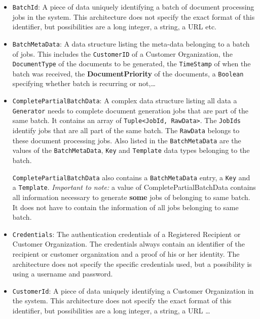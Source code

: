 \documentclass[a4paper,10pt]{article}
\begin{document}
\begin{itemize}
	\item \texttt{BatchId}: A piece of data uniquely identifying a batch of document processing jobs in the system. This architecture does not specify the exact format of this identifier, but possibilities are a long integer, a string, a URL etc.
	
	\item \texttt{BatchMetaData}: A data structure listing the meta-data belonging to a batch of jobs. This includes the \texttt{CustomerID} of a Customer Organization, the \texttt{DocumentType} of the documents to be generated, the \texttt{TimeStamp} of when the batch was received, the \textbf{DocumentPriority} of the documents, a \texttt{Boolean} specifying whether batch is recurring or not,\dots
	

	\item \texttt{CompletePartialBatchData}: A complex data structure listing all data a \texttt{Generator} needs to complete document generation jobs that are part of the same batch. It contains an array of \texttt{Tuple<JobId, RawData>}. The \texttt{JobIds} identify jobs that are all part of the same batch. The \texttt{RawData} belongs to these document processing jobs. Also listed in the \texttt{BatchMetaData} are the values of the \texttt{BatchMetaData}, \texttt{Key} and \texttt{Template} data types belonging to the batch.	
	
	 \texttt{CompletePartialBatchData} also contains a \texttt{BatchMetaData} entry, a \texttt{Key} and a \texttt{Template}. \emph{Important to note:} a value of CompletePartialBatchData contains all information necessary to generate \textbf{some} jobs of belonging to same batch. It does not have to contain the information of all jobs belonging to same batch.

	\item \texttt{Credentials}: The authentication credentials of a Registered Recipient or Customer Organization. The credentials always contain an identifier of the recipient or customer organization and a proof of his or her identity. The architecture does not specify the specific credentials used, but a possibility is using a username and password.
	 
	\item \texttt{CustomerId}: A piece of data uniquely identifying a Customer Organization in the system. This architecture does not specify the exact format of this identifier, but possibilities are a long integer, a string, a URL \dots
	

\end{itemize}
\end{document}

